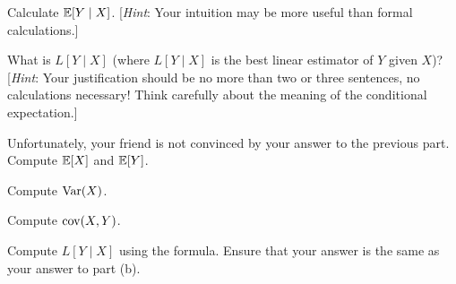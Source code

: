 \documentclass[11pt]{article}
\begin{document}
\begin{Parts}

    \Part Calculate $\operatorname{\mathbb{E}}[Y \mid X]$. [\textit{Hint}: Your intuition may be more useful than formal calculations.]

    \Part What is $L[Y \mid X]$ (where $L[Y \mid X]$ is the best linear estimator of $Y$ given $X$)? [\textit{Hint}: Your justification should be no more than two or three sentences, no calculations necessary! Think carefully about the meaning of the conditional expectation.]

  \Part Unfortunately, your friend is not convinced by your answer to the previous part. Compute $\operatorname{\mathbb{E}}[X]$ and $\operatorname{\mathbb{E}}[Y]$.

  \Part Compute $\operatorname{Var}(X)$.

  \Part Compute $\operatorname{cov}(X, Y)$.

  \Part Compute $L[Y \mid X]$ using the formula. Ensure that your answer is the same as your answer to part (b).

\end{Parts}
\end{document}
